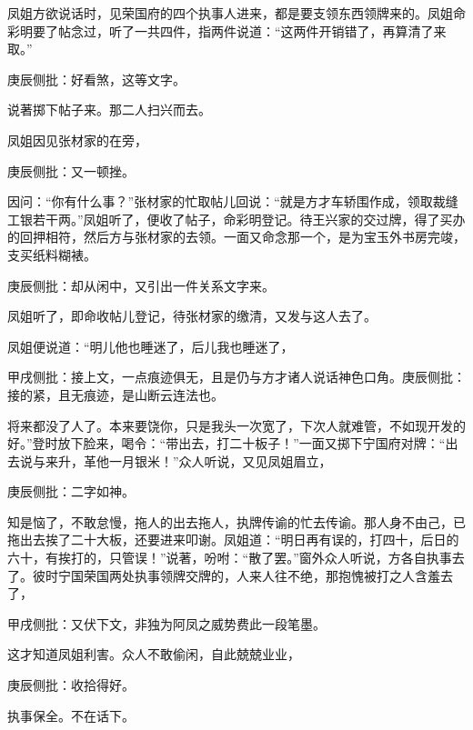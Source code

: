 \begin{parag}
    凤姐方欲说话时，见荣国府的四个执事人进来，都是要支领东西领牌来的。凤姐命彩明要了帖念过，听了一共四件，指两件说道：“这两件开销错了，再算清了来取。”\begin{note}庚辰侧批：好看煞，这等文字。\end{note}说著掷下帖子来。那二人扫兴而去。
\end{parag}


\begin{parag}
    凤姐因见张材家的在旁，\begin{note}庚辰侧批：又一顿挫。\end{note}因问：“你有什么事？”张材家的忙取帖儿回说：“就是方才车轿围作成，领取裁缝工银若干两。”凤姐听了，便收了帖子，命彩明登记。待王兴家的交过牌，得了买办的回押相符，然后方与张材家的去领。一面又命念那一个，是为宝玉外书房完竣，支买纸料糊裱。\begin{note}庚辰侧批：却从闲中，又引出一件关系文字来。\end{note}凤姐听了，即命收帖儿登记，待张材家的缴清，又发与这人去了。
\end{parag}


\begin{parag}
    凤姐便说道：“明儿他也睡迷了，后儿我也睡迷了，\begin{note}甲戌侧批：接上文，一点痕迹俱无，且是仍与方才诸人说话神色口角。庚辰侧批：接的紧，且无痕迹，是山断云连法也。\end{note}将来都没了人了。本来要饶你，只是我头一次宽了，下次人就难管，不如现开发的好。”登时放下脸来，喝令：“带出去，打二十板子！”一面又掷下宁国府对牌：“出去说与来升，革他一月银米！”众人听说，又见凤姐眉立，\begin{note}庚辰侧批：二字如神。\end{note}知是恼了，不敢怠慢，拖人的出去拖人，执牌传谕的忙去传谕。那人身不由己，已拖出去挨了二十大板，还要进来叩谢。凤姐道：“明日再有误的，打四十，后日的六十，有挨打的，只管误！”说著，吩咐：“散了罢。”窗外众人听说，方各自执事去了。彼时宁国荣国两处执事领牌交牌的，人来人往不绝，那抱愧被打之人含羞去了，\begin{note}甲戌侧批：又伏下文，非独为阿凤之威势费此一段笔墨。\end{note}这才知道凤姐利害。众人不敢偷闲，自此兢兢业业，\begin{note}庚辰侧批：收拾得好。\end{note}执事保全。不在话下。
\end{parag}


